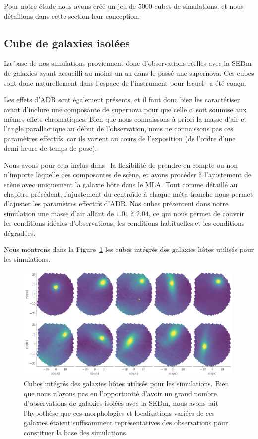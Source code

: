 \documentclass[../main/main.tex]{subfiles}
\begin{document}
Pour notre étude nous avons créé un jeu de $5000$ cubes de simulations,
et nous  détaillons dans cette section leur conception.

\subsection{Cube de galaxies isolées}

La base de nos simulations proviennent donc d'observations réelles avec
la SEDm de galaxies ayant accueilli au moins un an dans le passé une
supernova.
Ces cubes sont donc naturellement dans l'espace de l'instrument pour
lequel \hypergal\ a été conçu.

Les effets d'ADR sont également présents, et il faut donc bien les
caractériser avant d'inclure une composante de supernova pour que celle
ci soit soumise aux mêmes effets chromatiques. 
Bien que nous connaissons à priori la masse d'air et l'angle
parallactique au début de l'observation, nous ne connaissons pas ces
paramètres effectifs, car ils varient au cours de l'exposition
(de l'ordre d'une demi-heure de temps de pose).

Nous avons pour cela inclus dans \hypergal\ la flexibilité de prendre en
compte ou non n'importe laquelle des composantes de scène, et avons
procéder à l'ajustement de scène avec uniquement la galaxie hôte dans le
MLA. Tout comme détaillé au chapitre précédent, l'ajustement du
centroïde à chaque méta-tranche nous permet d'ajuster les paramètres
effectifs d'ADR. Nos cubes présentent dans notre simulation une masse
d'air allant de $1.01$ à $2.04$, ce qui nous permet de couvrir les
conditions idéales d'observations, les conditions habituelles et les
conditions dégradées.

Nous montrons dans la Figure~\ref{fig:allhostsimu} les cubes intégrés
des galaxies hôtes utilisés pour les simulations.
\begin{figure}[ht]
  \centering
  \includegraphics[width=0.99\textwidth]{../figures/08_simu/allhostsimu.pdf}
  \caption[Cubes de galaxies hôtes utilisés pour les simulations.]{Cubes
    intégrés des galaxies hôtes utilisés pour les simulations. Bien que
    nous n'ayons pas eu l'opportunité d'avoir un grand nombre
    d'observations de galaxies isolées avec la SEDm, nous avons fait
    l'hypothèse que ces morphologies et localisations variées de ces
    galaxies étaient suffisamment représentatives des observations pour
    constituer la base des simulations.}
  \label{fig:allhostsimu}
\end{figure}
\end{document}
